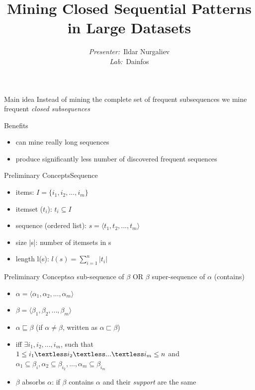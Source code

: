 \documentclass[12pt]{beamer}
\title{\fontsize{15}{15}\selectfont
	\textbf{Mining Closed Sequential Patterns in Large Datasets
}}
\author{
	\fontvi
	\small{%
\emph{Presenter:}~Ildar Nurgaliev\\%
\emph{Lab:}~Dainfos}\\%
}
\date{}
\begin{document}
\maketitle

\begin{frame}{Main idea}
  Instead of mining the complete set of frequent subsequences we mine frequent \textit{closed subsequences}
\end{frame}

\begin{frame}{Benefits}
\begin{itemize}
\item can mine really long sequences
\item produce significantly less number of discovered frequent sequences
\end{itemize}
\end{frame}

\begin{frame}{Preliminary Concepts}{Sequence}
\begin{itemize}
\item items: $\textit{I} = \{i_1, i_2, ..., i_m\}$
\item itemset ($t_i$): $t_i \subseteq \textit{I}$
\item sequence (ordered list): $s = \langle t_1, t_2, ..., t_m \rangle$
\item size |s|: number of itemsets in s
\item length l(s): $l(s)=\sum\limits_{i=1}^n |t_i|$
\end{itemize}
\end{frame}

\begin{frame}{Preliminary Concepts}{$\alpha$ sub-sequence of $\beta$ OR $\beta$ super-sequence of $\alpha$ (contains)}
\begin{itemize}
\item $\alpha = \langle \alpha_1, \alpha_2, ..., \alpha_m \rangle$
\item $\beta = \langle \beta_1, \beta_2, ..., \beta_m \rangle$
\item $\alpha \sqsubseteq \beta$ (if $\alpha \neq \beta$, written as $\alpha \sqsubset \beta$)
\item iff $\exists i_1, i_2,...,i_m$, such that\\ $1 \leq i_1 \textless i_2 \textless ... \textless i_m \leq n$ and\\ $\alpha_1 \subseteq \beta_i,\alpha_2 \subseteq \beta_{i_2},...,\alpha_m \subseteq \beta_{i_m}$
\item $\beta$ absorbs $\alpha$: if $\beta$ contains $\alpha$ and their \textit{support} are the same
\end{itemize}
\end{frame}
\end{document}
